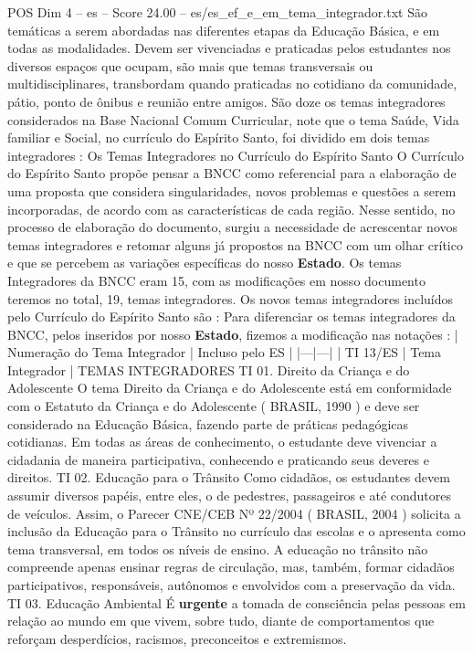 \begin{textsample}{POS Dim 4 – es – Score 24.00 – es/es\_ef\_e\_em\_tema\_integrador.txt}
São temáticas a serem abordadas nas diferentes etapas da Educação Básica, e em todas as modalidades.
Devem ser vivenciadas e praticadas pelos estudantes nos diversos espaços que ocupam, são mais que temas transversais ou multidisciplinares, transbordam quando praticadas no cotidiano da comunidade, pátio, ponto de ônibus e reunião entre amigos.
São doze os temas integradores considerados na Base Nacional Comum Curricular, note que o tema Saúde, Vida familiar e Social, no currículo do Espírito Santo, foi dividido em dois temas integradores : Os Temas Integradores no Currículo do Espírito Santo O Currículo do Espírito Santo propõe pensar a BNCC como referencial para a elaboração de uma proposta que considera singularidades, novos problemas e questões a serem incorporadas, de acordo com as características de cada região.
Nesse sentido, no processo de elaboração do documento, surgiu a necessidade de acrescentar novos temas integradores e retomar alguns já propostos na BNCC com um olhar crítico e que se percebem as variações específicas do nosso \textbf{Estado}.
Os temas Integradores da BNCC eram 15, com as modificações em nosso documento teremos no total, 19, temas integradores.
Os novos temas integradores incluídos pelo Currículo do Espírito Santo são : Para diferenciar os temas integradores da BNCC, pelos inseridos por nosso \textbf{Estado}, fizemos a modificação nas notações : | Numeração do Tema Integrador | Incluso pelo ES | |---|---| | TI 13/ES | Tema Integrador | TEMAS INTEGRADORES TI 01.
Direito da Criança e do Adolescente O tema Direito da Criança e do Adolescente está em conformidade com o Estatuto da Criança e do Adolescente ( BRASIL, 1990 ) e deve ser considerado na Educação Básica, fazendo parte de práticas pedagógicas cotidianas.
Em todas as áreas de conhecimento, o estudante deve vivenciar a cidadania de maneira participativa, conhecendo e praticando seus deveres e direitos.
TI 02.
Educação para o Trânsito Como cidadãos, os estudantes devem assumir diversos papéis, entre eles, o de pedestres, passageiros e até condutores de veículos.
Assim, o Parecer CNE/CEB Nº 22/2004 ( BRASIL, 2004 ) solicita a inclusão da Educação para o Trânsito no currículo das escolas e o apresenta como tema transversal, em todos os níveis de ensino.
A educação no trânsito não compreende apenas ensinar regras de circulação, mas, também, formar cidadãos participativos, responsáveis, autônomos e envolvidos com a preservação da vida.
TI 03.
Educação Ambiental É \textbf{urgente} a tomada de consciência pelas pessoas em relação ao mundo em que vivem, sobre tudo, diante de comportamentos que reforçam desperdícios, racismos, preconceitos e extremismos.

\end{textsample}
